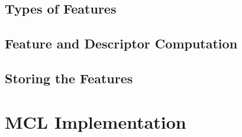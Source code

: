 \documentclass[a4paper,11pt]{article}
\begin{document}
  \subsection{Types of Features}

  \subsection{Feature and Descriptor Computation}
  
  \subsection{Storing the Features}









  \section{MCL Implementation}
   
  








  
\end{document}
